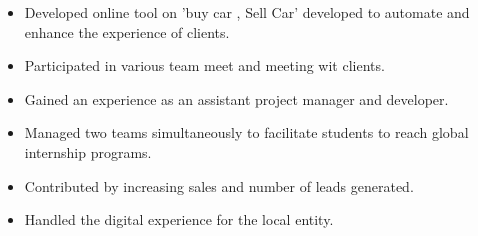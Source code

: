 \documentclass[10pt,a4paper]{altacv}
\begin{document}
\tagline{}

\begin{fullwidth}
\makecvheader
\end{fullwidth}



\begin{itemize}
\item Developed online tool on 'buy car , Sell Car' developed to automate and enhance the experience of clients.
\item Participated in various team meet and meeting wit clients.
\item Gained an experience as an assistant project manager and developer.
\end{itemize}


\divider

\begin{itemize}
\item Managed two teams simultaneously to facilitate students to reach global internship programs.
\item Contributed by increasing sales and number of leads generated.
\item Handled the digital experience for the local entity.
\end{itemize}
\end{document}
